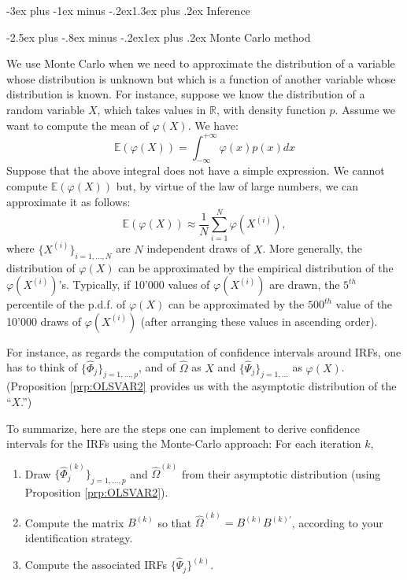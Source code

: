 \documentclass[
  11pt,
]{book}
\makeatletter
\providecommand{\tightlist}{%
  \setlength{\itemsep}{0pt}\setlength{\parskip}{0pt}}
\renewcommand\section{\@startsection{section}{1}{\z@}
  {-3ex plus -1ex minus -.2ex}{1.3ex plus .2ex}
  {\normalfont\Large\bfseries\color{TextbookInk}}}
\renewcommand\subsection{\@startsection{subsection}{2}{\z@}
  {-2.5ex plus -.8ex minus -.2ex}{1ex plus .2ex}
  {\normalfont\large\bfseries\color{TextbookInk}}}
\theoremstyle{definition}
\theoremstyle{definition}
\theoremstyle{definition}
\theoremstyle{definition}
\theoremstyle{remark}
\makeatother
\begin{document}
\section{Inference}\label{Inference}

\subsection{Monte Carlo method}\label{MonteCarlo}

We use Monte Carlo when we need to approximate the distribution of a variable whose distribution is unknown but which is a function of another variable whose distribution is known. For instance, suppose we know the distribution of a random variable \(X\), which takes values in \(\mathbb{R}\), with density function \(p\). Assume we want to compute the mean of \(\varphi(X)\). We have:
\[
\mathbb{E}(\varphi(X))=\int_{-\infty}^{+\infty}\varphi(x)p(x)dx
\]
Suppose that the above integral does not have a simple expression. We cannot compute \(\mathbb{E}(\varphi(X))\) but, by virtue of the law of large numbers, we can approximate it as follows:
\[
\mathbb{E}(\varphi(X))\approx\frac{1}{N}\sum_{i=1}^N\varphi(X^{(i)}),
\]
where \(\{X^{(i)}\}_{i=1,...,N}\) are \(N\) independent draws of \(X\). More generally, the distribution of \(\varphi(X)\) can be approximated by the empirical distribution of the \(\varphi(X^{(i)})\)'s. Typically, if 10'000 values of \(\varphi(X^{(i)})\) are drawn, the \(5^{th}\) percentile of the p.d.f. of \(\varphi(X)\) can be approximated by the \(500^{th}\) value of the 10'000 draws of \(\varphi(X^{(i)})\) (after arranging these values in ascending order).

For instance, as regards the computation of confidence intervals around IRFs, one has to think of \(\{\widehat{\Phi}_j\}_{j=1,...,p}\), and of \(\widehat{\Omega}\) as \(X\) and \(\{\widehat{\Psi}_j\}_{j=1,...}\) as \(\varphi(X)\). (Proposition \ref{prp:OLSVAR2} provides us with the asymptotic distribution of the ``\(X\).'')

To summarize, here are the steps one can implement to derive confidence intervals for the IRFs using the Monte-Carlo approach: For each iteration \(k\),

\begin{enumerate}
\def\labelenumi{\arabic{enumi}.}
\tightlist
\item
  Draw \(\{\widehat{\Phi}_j^{(k)}\}_{j=1,...,p}\) and \(\widehat{\Omega}^{(k)}\) from their asymptotic distribution (using Proposition \ref{prp:OLSVAR2}).
\item
  Compute the matrix \(B^{(k)}\) so that \(\widehat{\Omega}^{(k)}=B^{(k)}B^{(k)'}\), according to your identification strategy.
\item
  Compute the associated IRFs \(\{\widehat{\Psi}_j\}^{(k)}\).
\end{enumerate}
\end{document}
